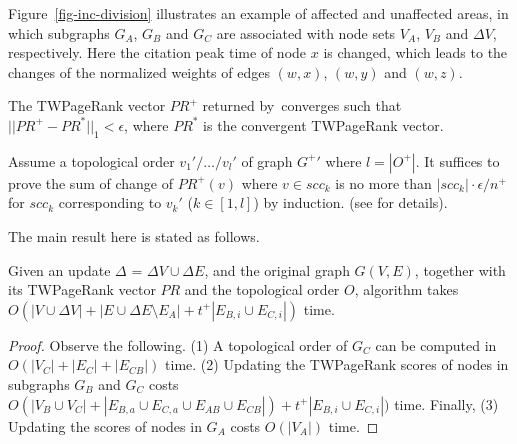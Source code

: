 \begin{example} \label{eg-layer-dag}
Figure~\ref{fig-inc-division} illustrates an example of affected and unaffected areas, in which subgraphs $G_A$, $G_B$ and $G_C$ are associated with node sets $V_A$, $V_B$ and $\Delta V$, respectively. Here the citation peak time of node $x$ is changed, which leads to the changes of the normalized weights of edges $(w,x)$, $(w,y)$ and $(w,z)$.
\end{example}


\begin{lemma} \label{lemma-subgraphA}
The TWPageRank vector $PR^+$ returned by~\inctwprscc converges such that $||PR^+-PR^{*}||_1 < \epsilon$, where $PR^{*}$ is the convergent TWPageRank vector.
\end{lemma}

\begin{proofSketch}
Assume a topological order $v_1'/\dots/v_{l}'$ of graph $G^+{'}$ where $l=|O^+|$. It suffices to prove the sum of change of $PR^+(v)$ where $v\in scc_k$ is no more than $|scc_k|\cdot\epsilon/n^+$ for $scc_k$ corresponding to $v_k'$ ($k\in [1,l]$) by induction.
(see \cite{ERank-full} for details).
\end{proofSketch}

The main result here is stated as follows.


\begin{theorem} \label{lemma-inc-citation-comp}
Given an update $\Delta$ = $\Delta V\cup\Delta E$, and the original graph $G(V,E)$, together with its TWPageRank vector $PR$ and the topological order $O$, algorithm \inctwprscc takes $O(|V\cup \Delta V|+|E\cup\Delta E\setminus E_A|+t^+|E_{B,i}\cup E_{C,i}|)$ time.
\end{theorem}

\begin{proof}
Observe the following. (1) A topological order of $G_C$ can be computed in $O(|V_C|+|E_C|+|E_{CB}|)$ time.
(2) Updating the TWPageRank scores of nodes in subgraphs $G_B$ and $G_C$ costs $O(|V_B\cup V_C|+|E_{B,a}\cup E_{C,a}\cup E_{AB}\cup E_{CB}|)+t^+|E_{B,i}\cup E_{C,i}|)$ time. Finally, (3) Updating the scores of nodes in $G_A$ costs $O(|V_A|)$ time.
\end{proof}


